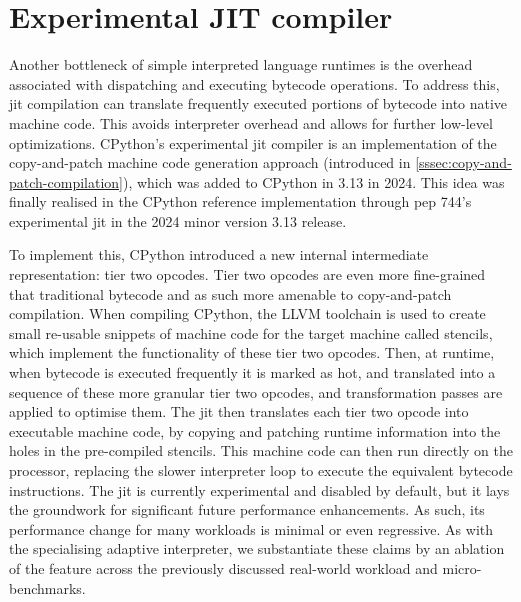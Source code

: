 

\section{Experimental JIT compiler}
\label{sec:experimental-jit-compiler}

Another bottleneck of simple interpreted language runtimes is the overhead associated with dispatching and executing bytecode operations.
To address this, \acf{jit} compilation can translate frequently executed portions of bytecode into native machine code. This avoids interpreter overhead and allows for further low-level optimizations.
CPython's experimental \ac{jit} compiler is an implementation of the copy-and-patch machine code generation approach (introduced in \autoref{sssec:copy-and-patch-compilation}), which was added to CPython in 3.13 in 2024.
This idea was finally realised in the CPython reference implementation through \ac{pep} 744's experimental \ac{jit} in the 2024 minor version 3.13 release.

To implement this, CPython introduced a new internal intermediate representation: tier two opcodes. Tier two opcodes are even more fine-grained that traditional bytecode and as such more amenable to copy-and-patch compilation.
When compiling CPython, the LLVM toolchain is used to create small re-usable snippets of machine code for the target machine called stencils, which implement the functionality of these tier two opcodes. Then, at runtime, when bytecode is executed frequently it is marked as hot, and translated into a sequence of these more granular tier two opcodes, and transformation passes are applied to optimise them. The \ac{jit} then translates each tier two opcode into executable machine code, by copying and patching runtime information into the holes in the pre-compiled stencils. This machine code can then run directly on the processor, replacing the slower interpreter loop to execute the equivalent bytecode instructions. %
The \ac{jit} is currently experimental and disabled by default, but it lays the groundwork for significant future performance enhancements. As such, its performance change for many workloads is minimal or even regressive.
As with the specialising adaptive interpreter, we substantiate these claims by an ablation of the feature across the previously discussed real-world workload and micro-benchmarks.

